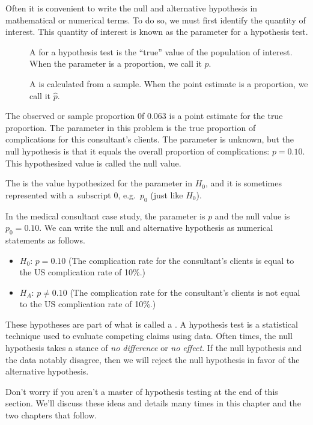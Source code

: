 Often it is convenient to write the null and alternative hypothesis in mathematical or numerical terms. To do so, we must first identify the quantity of interest. This quantity of interest is known as the parameter for a hypothesis test.

\begin{termBox}{
\vspace{-5mm}
\begin{description}
\item[] A  for a hypothesis test is the ``true'' value of the population of interest. When the parameter is a proportion, we call it $p$.
\item[] A  is calculated from a sample. When the point estimate is a proportion, we call it $\hat{p}$.
\end{description}
}
\end{termBox}

The observed or sample proportion 0f 0.063 is a point estimate for the true proportion. The parameter in this problem is the true proportion of complications for this consultant's clients. The parameter is unknown, but the null hypothesis is that it equals the overall proportion of complications: $p = 0.10$. This hypothesized value is called the null value.

\begin{termBox}{
The  is the value hypothesized for the parameter in $H_0$, and it is sometimes represented with a~subscript 0, e.g.~$p_0$ (just like $H_0$).}
\end{termBox}

In the medical consultant case study, the parameter is $p$ and the null value is $p_0 = 0.10$. We can write the null and alternative hypothesis as numerical statements as follows.
\begin{itemize}
\item $H_0$: $p=0.10$ (The complication rate for the consultant's clients is equal to the US complication rate of 10\%.)
\item $H_A$: $p \neq 0.10$ (The complication rate for the consultant's clients is not equal to the US complication rate of 10\%.)
\end{itemize}

\begin{termBox}{
These hypotheses are part of what is called a . A hypothesis test is a statistical technique used to evaluate competing claims using data. Often times, the null hypothesis takes a stance of \emph{no difference} or \emph{no effect}. If the null hypothesis and the data notably disagree, then we will reject the null hypothesis in favor of the alternative hypothesis.\vspace{3mm}

Don't worry if you aren't a master of hypothesis testing at the end of this section. We'll discuss these ideas and details many times in this chapter and the two chapters that follow.}
\end{termBox}

